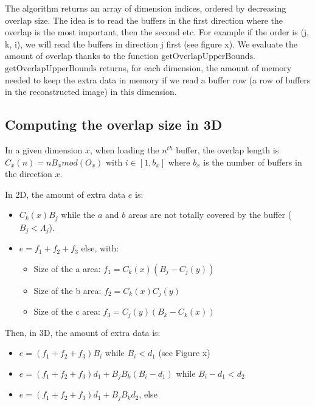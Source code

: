 \documentclass[conference]{IEEEtran}
\begin{document}
The algorithm returns an array of dimension indices, ordered by decreasing overlap size.
The idea is to read the buffers in the first direction where the overlap is the most important, then the second etc.
For example if the order is (j, k, i), we will read the buffers in direction j first (see figure x).
We evaluate the amount of overlap thanks to the function $\textrm{getOverlapUpperBounds}$.
$\textrm{getOverlapUpperBounds}$ returns, for each dimension, the amount of memory needed to keep the extra data in memory if we read a buffer row (a row of buffers in the reconstructed image) in this dimension. \\

\subsection{Computing the overlap size in 3D}

In a given dimension $x$, when loading the $n^{th}$ buffer, the overlap length is $C_x(n) = nB_x mod (O_x)$ with $i \in [1, b_x]$ where $b_x$ is the number of buffers in the direction $x$.


In 2D, the amount of extra data $e$ is:
\begin{itemize}
  \item $C_k(x)B_j$ while the $a$ and $b$ areas are not totally covered by the buffer ($B_j < \Lambda_j$).
  \item $e = f_1+f_2+f_3$ else, with:
  \begin{itemize}
    \item Size of the a area: $f_1 = C_k(x)(B_j-C_j(y))$
    \item Size of the b area: $f_2 = C_k(x)C_j(y)$
    \item Size of the c area: $f_3 = C_j(y)(B_k-C_k(x))$
  \end{itemize}
\end{itemize}


Then, in 3D, the amount of extra data is:
\begin{itemize}
  \item $e = (f_1+f_2+f_3)B_i$ while $B_i < d_1$ (see Figure x)
  \item $e = (f_1+f_2+f_3)d_1 + B_jB_k(B_i-d_1)$ while $B_i-d_1 < d_2$
  \item $e = (f_1+f_2+f_3)d_1 + B_jB_kd_2$, else
\end{itemize}
\end{document}
